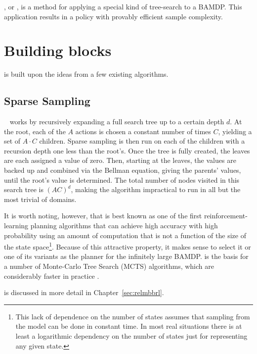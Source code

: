 \label{chap:bfs3}

, or , is a method for applying a special kind of tree-search to a BAMDP. This application results in a policy with provably efficient sample complexity.

\section{Building blocks}

 is built upon the ideas from a few existing algorithms.

\subsection{Sparse Sampling}

~\cite{kearns99b} works by recursively expanding a full search tree up to a certain depth $d$. At the root, each of the $A$ actions is chosen a constant number of times $C$, yielding a set of $A\cdot C$ children. Sparse sampling is then run on each of the children with a recursion depth one less than the root's. Once the tree is fully created, the leaves are each assigned a value of zero. Then, starting at the leaves, the values are backed up and combined via the Bellman equation, giving the parents' values, until the root's value is determined. The total number of nodes visited in this search tree is $(AC)^d$, making the algorithm impractical to run in all but the most trivial of domains.

It is worth noting, however, that  is best known as one of the first reinforcement-learning planning algorithms that can achieve high accuracy with high probability using an amount of computation that is not a function of the size of the state space\footnote{This lack of dependence on the number of states assumes that sampling from the model can be done in constant time. In most real situations there is at least a logarithmic dependency on the number of states just for representing any given state.}. Because of this attractive property, it makes sense to select it or one of its variants as the planner for the infinitely large BAMDP.   is the basis for a number of Monte-Carlo Tree Search (MCTS) algorithms, which are considerably faster in practice \cite{kocsis06,walsh10,wang05}.

 is discussed in more detail in Chapter~\ref{sec:relmbbrl}.

